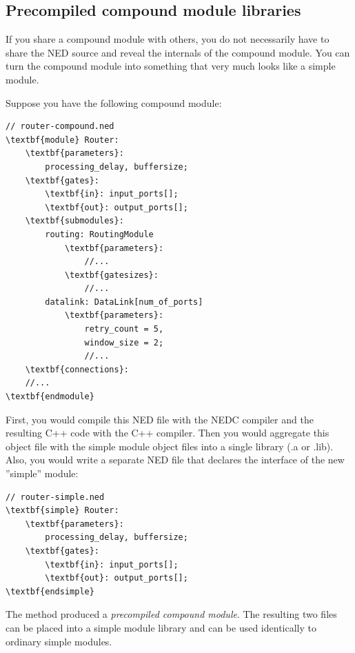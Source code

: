 \subsection{Precompiled compound module libraries}


If you share a compound module with others, you do not necessarily
have to share the NED source and reveal the internals of the compound
module. You can turn the compound module into something that very much
looks like a simple module.


Suppose you have the following compound module:


\begin{Verbatim}[commandchars=\\\{\}]
// router-compound.ned
\textbf{module} Router:
    \textbf{parameters}:
        processing_delay, buffersize;
    \textbf{gates}:
        \textbf{in}: input_ports[];
        \textbf{out}: output_ports[];
    \textbf{submodules}:
        routing: RoutingModule
            \textbf{parameters}:
                //...
            \textbf{gatesizes}:
                //...
        datalink: DataLink[num_of_ports]
            \textbf{parameters}:
                retry_count = 5,
                window_size = 2;
                //...
    \textbf{connections}:
    //...
\textbf{endmodule}
\end{Verbatim}
  

First, you would compile this NED file with the NEDC compiler 
and the resulting C++ code with the C++ compiler. Then you would 
aggregate this object file with the simple module object files 
into a single library (.a or .lib). Also, you would write a separate 
NED file that declares the interface of the new ''simple''
module:


\begin{Verbatim}[commandchars=\\\{\}]
// router-simple.ned
\textbf{simple} Router:
    \textbf{parameters}:
        processing_delay, buffersize;
    \textbf{gates}:
        \textbf{in}: input_ports[];
        \textbf{out}: output_ports[];
\textbf{endsimple}
\end{Verbatim}
  


The method produced a \textit{precompiled compound
  module}. The resulting two files
can be placed into a simple module library and
can be used identically to ordinary simple
modules.

